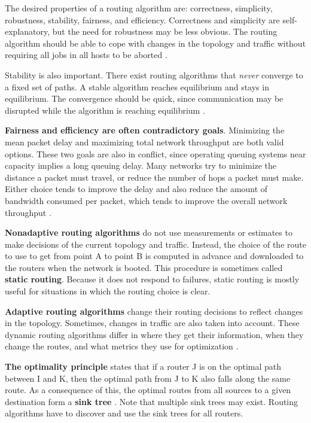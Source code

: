 \documentclass[12pt, oneside]{book}
\begin{document}
The desired properties of a routing algorithm are: correctness, simplicity, robustness, stability, fairness, and efficiency.
Correctness and simplicity are self-explanatory, but the need for robustness may be less obvious.
The routing algorithm should be able to cope with changes in the topology and traffic without requiring all jobs in all hosts to be aborted \cite[p.~363]{computer-networks-tanenbaum-2012}.

Stability is also important. There exist routing algorithms that \textit{never} converge to a fixed set of paths.
A stable algorithm reaches equilibrium and stays in equilibrium.
The convergence should be quick, since communication may be disrupted while the algorithm is reaching equilibrium \cite[p.~363]{computer-networks-tanenbaum-2012}.

\textbf{Fairness and efficiency are often contradictory goals}.
Minimizing the mean packet delay and maximizing total network throughput are both valid options.
These two goals are also in conflict, since operating queuing systems near capacity implies a long queuing delay.
Many networks try to minimize the distance a packet must travel, or reduce the number of hops a packet must make.
Either choice tends to improve the delay and also reduce the amount of bandwidth consumed per packet, which tends to improve the overall network throughput \cite[p.~363]{computer-networks-tanenbaum-2012}.

\textbf{Nonadaptive routing algorithms} do not use measurements or estimates to make decisions of the current topology and traffic.
Instead, the choice of the route to use to get from point A to point B is computed in advance and downloaded to the routers when the network is booted.
This procedure is sometimes called \textbf{static routing}.
Because it does not respond to failures, static routing is mostly useful for situations in which the routing choice is clear.

\textbf{Adaptive routing algorithms} change their routing decisions to reflect changes in the topology.
Sometimes, changes in traffic are also taken into account.
These dynamic routing algorithms differ in where they get their information, when they change the routes, and what metrics they use for optimization \cite[p.~364]{computer-networks-tanenbaum-2012}.

\textbf{The optimality principle} states that if a router J is on the optimal path between I and K, then the optimal path from J to K also falls along the same route. As a consequence of this, the optimal routes from all sources to a given destination form a \textbf{sink tree} \cite{dynamic-programming-bellman-2003}. Note that multiple sink trees may exist. Routing algorithms have to discover and use the sink trees for all routers.
\end{document}
